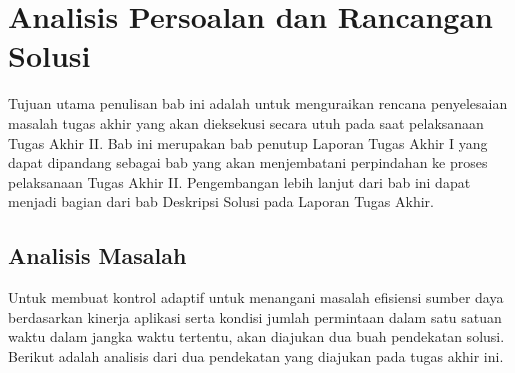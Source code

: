 \chapter{Analisis Persoalan dan Rancangan Solusi}

Tujuan utama penulisan bab ini adalah untuk menguraikan rencana penyelesaian masalah tugas akhir yang akan dieksekusi secara utuh pada saat pelaksanaan Tugas Akhir II. Bab ini merupakan bab penutup Laporan Tugas Akhir I yang dapat dipandang sebagai bab yang akan menjembatani perpindahan ke proses pelaksanaan Tugas Akhir II. Pengembangan lebih lanjut dari bab ini dapat menjadi bagian dari bab Deskripsi Solusi pada Laporan Tugas Akhir.

\section{Analisis Masalah}


Untuk membuat kontrol adaptif untuk menangani masalah efisiensi sumber daya berdasarkan kinerja aplikasi serta kondisi jumlah permintaan dalam satu satuan waktu dalam jangka waktu tertentu, akan diajukan dua buah pendekatan solusi. Berikut adalah analisis dari dua pendekatan yang diajukan pada tugas akhir ini.




